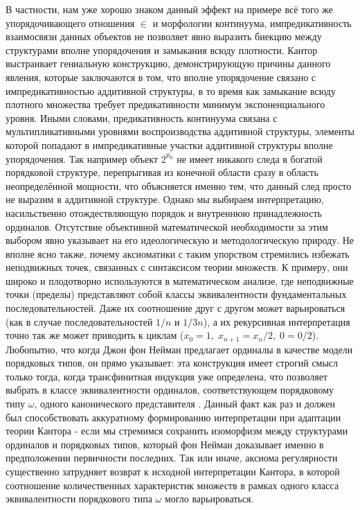 \documentclass[12pt]{article}
\begin{document}
В частности, нам уже хорошо знаком данный эффект на примере всё того же упорядочивающего отношения $\in$ и морфологии континуума, импредикативность взаимосвязи данных объектов не позволяет явно выразить биекцию между структурами вполне упорядочения и замыкания всюду плотности. Кантор выстраивает гениальную конструкцию, демонстрирующую причины данного явления, которые заключаются в том, что вполне упорядочение связано с импредикативностью аддитивной структуры, в то время как замыкание всюду плотного множества требует предикативности минимум экспоненциального уровня. Иными словами, предикативность континуума связана с мультипликативными уровнями воспроизводства аддитивной структуры, элементы которой попадают в импредикативные участки аддитивной структуры вполне упорядочения. Так например объект $2^{\aleph_0}$ не имеет никакого следа в богатой порядковой структуре, перепрыгивая из конечной области сразу в область неопределённой мощности, что объясняется именно тем, что данный след просто не выразим в аддитивной структуре. Однако мы выбираем интерпретацию, насильственно отождествляющую порядок и внутреннюю принадлежность ординалов. Отсутствие объективной математической необходимости за этим выбором явно указывает на его идеологическую и методологическую природу. Не вполне ясно также, почему аксиоматики с таким упорством стремились избежать неподвижных точек, связанных с синтаксисом теории множеств. К примеру, они широко и плодотворно используются в математическом анализе, где неподвижные точки (пределы) представляют собой классы эквивалентности фундаментальных последовательностей. Даже их соотношение друг с другом может варьироваться (как в случае последовательностей $1/n$ и $1/3n$), а их рекурсивная интерпретация точно так же может приводить к циклам ($x_0 = 1, \; x_{n+1} = x_n / 2, \; 0 = 0 / 2$). Любопытно, что когда Джон фон Нейман предлагает ординалы в качестве модели порядковых типов, он прямо указывает: эта конструкция имеет строгий смысл только тогда, когда трансфинитная индукция уже определена, что позволяет выбрать в классе эквивалентности ординалов, соответствующем порядковому типу $\omega$, одного канонического представителя \cite{von-neumann-ordinals}. Данный факт как раз и должен был способствовать аккуратному формированию интерпретации при адаптации теории Кантора - если мы стремимся сохранить изоморфизм между структурами ординалов и порядковых типов, который фон Нейман доказывает именно в предположении первичности последних. Так или иначе, аксиома регулярности существенно затрудняет возврат к исходной интерпретации Кантора, в которой соотношение количественных характеристик множеств в рамках одного класса эквивалентности порядкового типа $\omega$ могло варьироваться.
\end{document}
